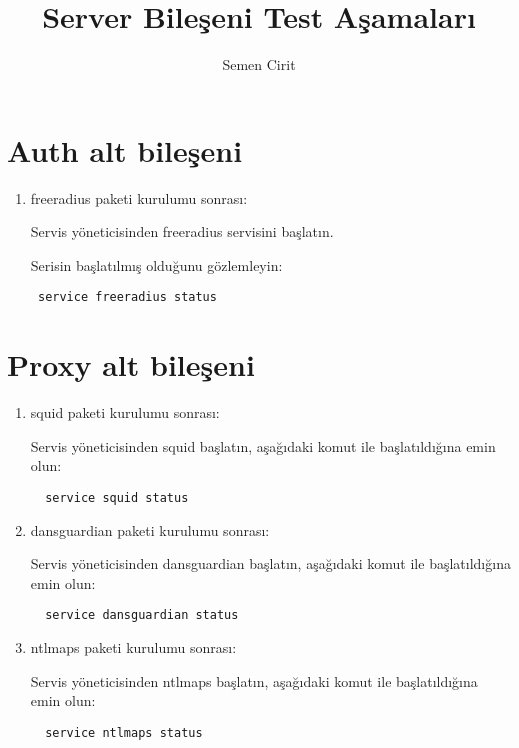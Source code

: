 \documentclass[a4paper,10pt]{article}
\title{Server Bileşeni Test Aşamaları}
\author{Semen Cirit}
\begin{document}
\maketitle
\section{Auth alt bileşeni}
\begin{enumerate}
\item freeradius paketi kurulumu sonrası:

Servis yöneticisinden freeradius servisini başlatın.

Serisin başlatılmış olduğunu gözlemleyin:
\begin{verbatim}
 service freeradius status
\end{verbatim}


% 
\end{enumerate}

\section{Proxy alt bileşeni}
\begin{enumerate}
\item squid paketi kurulumu sonrası:

Servis yöneticisinden squid başlatın, aşağıdaki komut ile başlatıldığına emin olun:
\begin{verbatim}
  service squid status
\end{verbatim}
 \item dansguardian paketi kurulumu sonrası:

Servis yöneticisinden dansguardian başlatın, aşağıdaki komut ile başlatıldığına emin olun:
\begin{verbatim}
  service dansguardian status
\end{verbatim}
\item ntlmaps paketi kurulumu sonrası:

Servis yöneticisinden ntlmaps başlatın, aşağıdaki komut ile başlatıldığına emin olun:
\begin{verbatim}
  service ntlmaps status
\end{verbatim}
\end{enumerate}
\end{document}
